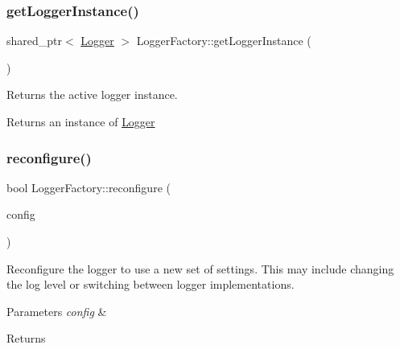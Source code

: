\subsubsection{\texorpdfstring{get\+Logger\+Instance()}{getLoggerInstance()}}
{\footnotesize\ttfamily shared\+\_\+ptr$<$ \hyperlink{class_aws_1_1_iot_1_1_device_client_1_1_logging_1_1_logger}{Logger} $>$ Logger\+Factory\+::get\+Logger\+Instance (\begin{DoxyParamCaption}{ }\end{DoxyParamCaption})\hspace{0.3cm}{\ttfamily [static]}}



Returns the active logger instance. 

\begin{DoxyReturn}{Returns}
an instance of \hyperlink{class_aws_1_1_iot_1_1_device_client_1_1_logging_1_1_logger}{Logger} 
\end{DoxyReturn}
\mbox{\label{class_aws_1_1_iot_1_1_device_client_1_1_logging_1_1_logger_factory_aa653d2356cf9852d3dd07a3f1017393f}} 
\subsubsection{\texorpdfstring{reconfigure()}{reconfigure()}}
{\footnotesize\ttfamily bool Logger\+Factory\+::reconfigure (\begin{DoxyParamCaption}\item[{const \hyperlink{struct_aws_1_1_iot_1_1_device_client_1_1_plain_config}{Plain\+Config} \&}]{config }\end{DoxyParamCaption})\hspace{0.3cm}{\ttfamily [static]}}



Reconfigure the logger to use a new set of settings. This may include changing the log level or switching between logger implementations. 


\begin{DoxyParams}{Parameters}
{\em config} & \\
\hline
\end{DoxyParams}
\begin{DoxyReturn}{Returns}

\end{DoxyReturn}


